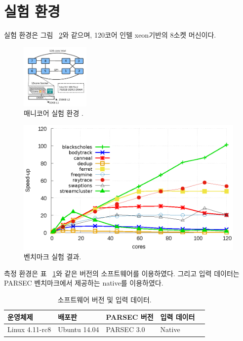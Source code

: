 \documentclass{kcc}
\begin{document}
\section{실험 환경}

실험 환경은 그림 ~\ref{fig:parsec}와 같으며, 120코어 인텔 xeon기반의 8소켓 머신이다. 
\begin{figure}[h]
  \begin{center}
     \includegraphics[width=0.3\textwidth]{fig/xeon}
  \end{center}
  \caption{매니코어 실험 환경 .}
  \label{fig:xeon}
\end{figure}

\begin{figure}[tb!]
    \centering
    \includegraphics[width=4.8in]{graph/PARSEC.eps}
    \caption{벤치마크 실험 결과.}
    \label{fig:parsec}
\end{figure}

측정 환경은 표 ~\ref{tab:config}와 같은 버전의 소프트웨어를 이용하였다. 
그리고 입력 데이터는 PARSEC 벤치마크에서 제공하는 native를 이용하였다.

\begin{table}[h!]
  \caption{소프트웨어 버전 및 입력 데이터.}
  \centering
  \small
  \begin{tabular}{l l l l l} \toprule
    운영체제 & 배포판 & PARSEC 버전 & 입력 데이터\\
    \midrule
    Linux 4.11-rc8 & Ubuntu 14.04 & PARSEC 3.0 & Native & \\
    \bottomrule
  \end{tabular}
  \label{tab:config}
\end{table}
\end{document}
